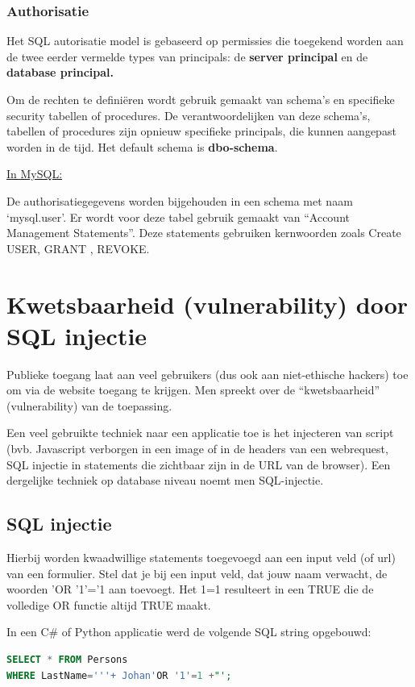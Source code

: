 \documentclass{article}
\newcommand{\bold}[1]{\textbf{#1}}
\begin{document}
\subsubsection{Authorisatie}
Het SQL autorisatie model is gebaseerd op permissies die toegekend worden aan de twee eerder vermelde types
van principals: de \bold{server principal} en de \bold{database principal.}

Om de rechten te definiëren wordt gebruik gemaakt van schema’s en specifieke security tabellen of procedures. De
verantwoordelijken van deze schema’s, tabellen of procedures zijn opnieuw specifieke principals, die kunnen
aangepast worden in de tijd. Het default schema is \bold{dbo-schema}.

\underline{In MySQL:}

De authorisatiegegevens worden bijgehouden in een schema met naam ‘mysql.user’. Er wordt voor deze tabel
gebruik gemaakt van ``Account Management Statements''. Deze statements gebruiken kernwoorden zoals Create
USER, GRANT , REVOKE.

\section{Kwetsbaarheid (vulnerability) door SQL injectie}

Publieke toegang laat aan veel gebruikers (dus ook aan niet-ethische hackers) toe om via de
website toegang te krijgen. Men spreekt over de “kwetsbaarheid” (vulnerability) van de toepassing.

Een veel gebruikte techniek naar een applicatie toe is het injecteren van script (bvb. Javascript verborgen
in een image of in de headers van een webrequest, SQL injectie in statements die zichtbaar zijn in de
URL van de browser). Een dergelijke techniek op database niveau noemt men SQL-injectie.

\subsection{SQL injectie}

Hierbij worden kwaadwillige statements toegevoegd aan een input veld (of url) van een formulier.
Stel dat je bij een input veld, dat jouw naam verwacht, de woorden 'OR '1'='1 aan toevoegt.
Het 1=1 resulteert in een TRUE die de volledige OR functie altijd TRUE maakt.

In een C\# of Python applicatie werd de volgende SQL string opgebouwd:

\begin{lstlisting}[language=SQL]
SELECT * FROM Persons
WHERE LastName='''+ Johan'OR '1'=1 +"';
\end{lstlisting}
\end{document}
